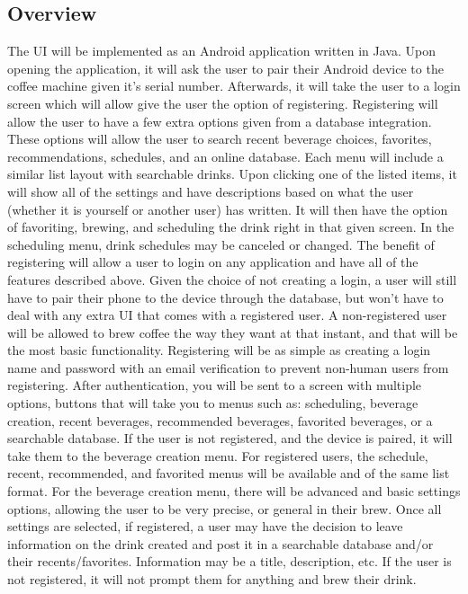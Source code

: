 \documentclass[conference]{IEEEtran}
\begin{document}
\subsection{Overview}
The UI will be implemented as an Android application written in Java. Upon
opening the application, it will ask the user to pair their Android device to
the coffee machine given it's serial number. Afterwards, it will take the user
to a login screen which will allow give the user the option of registering.
Registering will allow the user to have a few extra options given from a database
integration. These options will allow the user to search recent beverage
choices, favorites, recommendations, schedules, and an online database. Each
menu will include a similar list layout with searchable drinks. Upon clicking
one of the listed items, it will show all of the settings and have descriptions
based on what the user (whether it is yourself or another user) has written. It
will then have the option of favoriting, brewing, and scheduling the drink
right in that given screen. In the scheduling menu, drink schedules may be
canceled or changed. The benefit of registering will allow a user to login on
any application and have all of the features described above.
Given the choice of not creating a login, a user will still have to pair their
phone to the device through the database, but won't have to deal with any extra
UI that comes with a registered user. A non-registered user will be allowed to
brew coffee the way they want at that instant, and that will be the most basic
functionality. Registering will be as simple as creating a login name and
password with an email verification to prevent non-human users from
registering. After authentication, you will be sent to a screen with multiple
options, buttons that will take you to menus such as: scheduling, beverage
creation, recent beverages, recommended beverages, favorited beverages, or a
searchable database.
If the user is not registered, and the device is paired, it will take them to
the beverage creation menu.
For registered users, the schedule, recent, recommended, and favorited menus
will be available and of the same list format. For the beverage creation menu,
there will be advanced and basic settings options, allowing the user to be very
precise, or general in their brew. Once all settings are selected, if
registered, a user may have the decision to leave information on the drink
created and post it in a searchable database and/or their recents/favorites.
Information may be a title, description, etc. If the user is not registered, it
will not prompt them for anything and brew their drink.
\end{document}
